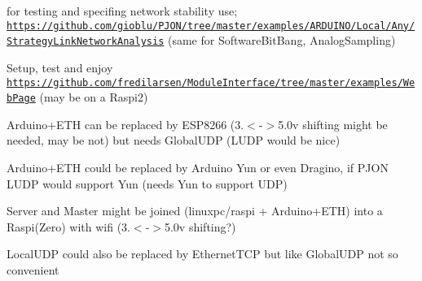 \begin{DoxyItemize}
\begin{DoxyItemize}
\item for testing and specifing network stability use; \href{https://github.com/gioblu/PJON/tree/master/examples/ARDUINO/Local/Any/StrategyLinkNetworkAnalysis}{\tt https\-://github.\-com/gioblu/\-P\-J\-O\-N/tree/master/examples/\-A\-R\-D\-U\-I\-N\-O/\-Local/\-Any/\-Strategy\-Link\-Network\-Analysis} (same for Software\-Bit\-Bang, Analog\-Sampling)
\end{DoxyItemize}
\item Setup, test and enjoy \href{https://github.com/fredilarsen/ModuleInterface/tree/master/examples/WebPage}{\tt https\-://github.\-com/fredilarsen/\-Module\-Interface/tree/master/examples/\-Web\-Page} (may be on a Raspi2)
\item Arduino+\-E\-T\-H can be replaced by E\-S\-P8266 (3.$<$-\/$>$5.\-0v shifting might be needed, may be not) but needs Global\-U\-D\-P (L\-U\-D\-P would be nice)
\item Arduino+\-E\-T\-H could be replaced by Arduino Yun or even Dragino, if P\-J\-O\-N L\-U\-D\-P would support Yun (needs Yun to support U\-D\-P)
\item Server and Master might be joined (linuxpc/raspi + Arduino+\-E\-T\-H) into a Raspi(\-Zero) with wifi (3.$<$-\/$>$5.\-0v shifting?)
\item Local\-U\-D\-P could also be replaced by Ethernet\-T\-C\-P but like Global\-U\-D\-P not so convenient 
\end{DoxyItemize}